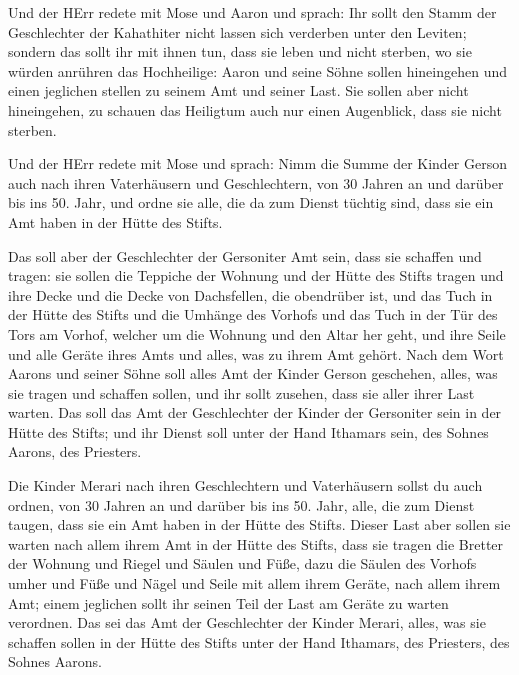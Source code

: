  Und der HErr redete mit Mose und Aaron und sprach:
 Ihr sollt den Stamm der Geschlechter der Kahathiter nicht
lassen sich verderben unter den Leviten;  sondern das sollt
ihr mit ihnen tun, dass sie leben und nicht sterben, wo sie würden
anrühren das Hochheilige: Aaron und seine Söhne sollen hineingehen und
einen jeglichen stellen zu seinem Amt und seiner Last.  Sie
sollen aber nicht hineingehen, zu schauen das Heiligtum auch nur einen
Augenblick, dass sie nicht sterben.

 Und der HErr redete mit Mose und sprach: 
Nimm die Summe der Kinder Gerson auch nach ihren Vaterhäusern und
Geschlechtern,  von 30 Jahren an und darüber bis ins 50.
Jahr, und ordne sie alle, die da zum Dienst tüchtig sind, dass sie ein
Amt haben in der Hütte des Stifts.

 Das soll aber der Geschlechter der Gersoniter Amt sein,
dass sie schaffen und tragen:  sie sollen die Teppiche der
Wohnung und der Hütte des Stifts tragen und ihre Decke und die Decke von
Dachsfellen, die obendrüber ist, und das Tuch in der Hütte des Stifts
 und die Umhänge des Vorhofs und das Tuch in der Tür des
Tors am Vorhof, welcher um die Wohnung und den Altar her geht, und ihre
Seile und alle Geräte ihres Amts und alles, was zu ihrem Amt gehört.
 Nach dem Wort Aarons und seiner Söhne soll alles Amt der
Kinder Gerson geschehen, alles, was sie tragen und schaffen sollen, und
ihr sollt zusehen, dass sie aller ihrer Last warten.  Das
soll das Amt der Geschlechter der Kinder der Gersoniter sein in der
Hütte des Stifts; und ihr Dienst soll unter der Hand Ithamars sein, des
Sohnes Aarons, des Priesters.

 Die Kinder Merari nach ihren Geschlechtern und
Vaterhäusern sollst du auch ordnen,  von 30 Jahren an und
darüber bis ins 50. Jahr, alle, die zum Dienst taugen, dass sie ein Amt
haben in der Hütte des Stifts.  Dieser Last aber sollen sie
warten nach allem ihrem Amt in der Hütte des Stifts, dass sie tragen die
Bretter der Wohnung und Riegel und Säulen und Füße,  dazu
die Säulen des Vorhofs umher und Füße und Nägel und Seile mit allem
ihrem Geräte, nach allem ihrem Amt; einem jeglichen sollt ihr seinen
Teil der Last am Geräte zu warten verordnen.  Das sei das
Amt der Geschlechter der Kinder Merari, alles, was sie schaffen sollen
in der Hütte des Stifts unter der Hand Ithamars, des Priesters, des
Sohnes Aarons.

